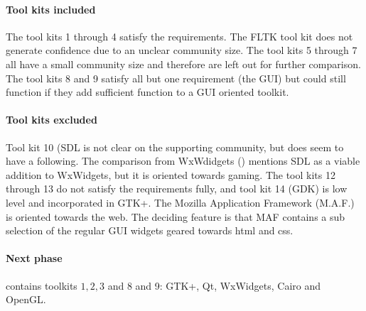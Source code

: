 \paragraph{Tool kits included} The tool kits 1 through 4 satisfy the requirements. 
The {\sf FLTK} tool kit does not generate confidence due to an unclear community size. 
The tool kits 5 through 7 all have a small community size and therefore are left out for further comparison. 
The tool kits 8 and 9 satisfy all but one requirement (the GUI) but could still function if they 
add sufficient function to a GUI oriented toolkit. 

\paragraph{Tool kits excluded}
Tool kit 10 ({\sf SDL} is not clear on the supporting community, but does seem to have a following. 
The comparison from WxWdidgets (\cite{wxwidget:comparison}) mentions {\sf SDL} as a viable addition 
to WxWidgets, but it is oriented towards gaming. The tool kits 12 through 13 do not satisfy the 
requirements fully, and tool kit 14 (GDK) is low level and incorporated in {\sf GTK+}. 
The Mozilla Application Framework ({\sf M.A.F.}) is oriented towards the web. The deciding feature 
is that {\sf MAF} contains a sub selection of the regular GUI widgets geared towards html and css.

\paragraph{Next phase}
contains toolkits $1, 2, 3$ and 8 and 9: {\sf GTK+, Qt, WxWidgets, Cairo and OpenGL}. 
